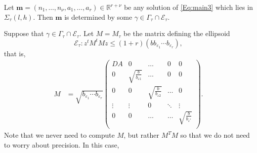 \begin{lemma}\label{lem:archsieve}
Let ${\mathbf{m} = (n_1, \dots, n_{\nu}, a_1, \dots, a_r) \in \mathbb{R}^{r + \nu}}$ be any solution of \eqref{Eq:main3} which lies in $\Sigma_\tau(l,h)$. Then $\mathbf{m}$ is determined by some $\gamma\in \Gamma_\tau\cap\mathcal E_\tau.$
\end{lemma}

%
Suppose that $\gamma\in \Gamma_\tau\cap \mathcal E_\tau$. Let $M=M_\tau$ be the matrix defining the ellipsoid 
\[\mathcal E_\tau: z^tM^tMz\leq (1 + r)(bb_{\varepsilon_1}\cdots b_{\varepsilon_r}),\]
that is,  
\begin{align*}
M &=\sqrt{b_{\varepsilon_1}\cdots b_{\varepsilon_r}}\begin{pmatrix}
	DA & 0 & \dots & 0 & 0\\
	0 & \sqrt{\frac{b}{b_{\varepsilon 1}}} & \dots & 0 & 0\\
	0 & 0  & \sqrt{\frac{b}{b_{\varepsilon 2}}} & \dots & 0\\
	\vdots & \vdots &0 &  \ddots & \vdots\\ 
	0 & 0 & \dots & \dots & \sqrt{\frac{b}{b_{\varepsilon^*}}} \\
	\end{pmatrix}.
\end{align*}	
Note that we never need to compute $M$, but rather $M^TM$ so that we do not need to worry about precision. In this case, 
